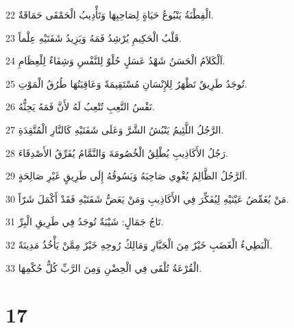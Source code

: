 \par 22 الْفِطْنَةُ يَنْبُوعُ حَيَاةٍ لِصَاحِبِهَا وَتَأْدِيبُ الْحَمْقَى حَمَاقَةٌ.
\par 23 قَلْبُ الْحَكِيمِ يُرْشِدُ فَمَهُ وَيَزِيدُ شَفَتَيْهِ عِلْماً.
\par 24 اَلْكَلاَمُ الْحَسَنُ شَهْدُ عَسَلٍ حُلْوٌ لِلنَّفْسِ وَشِفَاءٌ لِلْعِظَامِ.
\par 25 تُوجَدُ طَرِيقٌ تَظْهَرُ لِلإِنْسَانِ مُسْتَقِيمَةً وَعَاقِبَتُهَا طُرُقُ الْمَوْتِ.
\par 26 نَفْسُ التَّعِبِ تُتْعِبُ لَهُ لأَنَّ فَمَهُ يَحِثُّهُ.
\par 27 الرَّجُلُ اللَّئِيمُ يَنْبُشُ الشَّرَّ وَعَلَى شَفَتَيْهِ كَالنَّارِ الْمُتَّقِدَةِ.
\par 28 رَجُلُ الأَكَاذِيبِ يُطْلِقُ الْخُصُومَةَ وَالنَّمَّامُ يُفَرِّقُ الأَصْدِقَاءَ.
\par 29 اَلرَّجُلُ الظَّالِمُ يُغْوِي صَاحِبَهُ وَيَسُوقُهُ إِلَى طَرِيقٍ غَيْرِ صَالِحَةٍ.
\par 30 مَنْ يُغَمِّضُ عَيْنَيْهِ لِيُفَكِّرَ فِي الأَكَاذِيبِ وَمَنْ يَعَضُّ شَفَتَيْهِ فَقَدْ أَكْمَلَ شَرّاً.
\par 31 تَاجُ جَمَالٍ: شَيْبَةٌ تُوجَدُ فِي طَرِيقِ الْبِرِّ.
\par 32 اَلْبَطِيءُ الْغَضَبِ خَيْرٌ مِنَ الْجَبَّارِ وَمَالِكُ رُوحِهِ خَيْرٌ مِمَّنْ يَأْخُذُ مَدِينَةً.
\par 33 الْقُرْعَةُ تُلْقَى فِي الْحِضْنِ وَمِنَ الرَّبِّ كُلُّ حُكْمِهَا.

\chapter{17}

